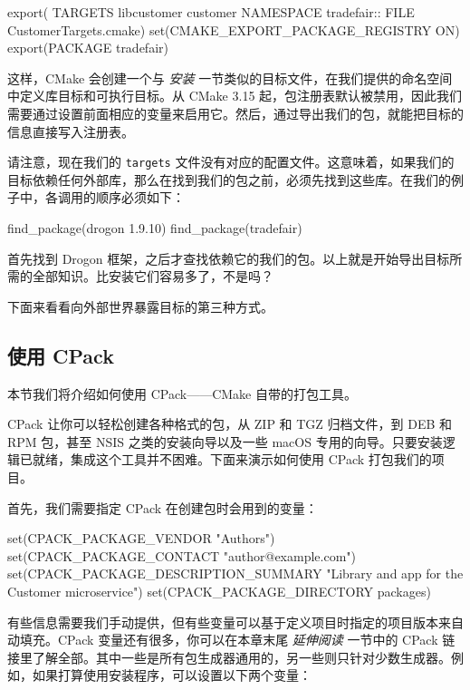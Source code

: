 \begin{codebox}[cmake]
export(
  TARGETS libcustomer customer
  NAMESPACE tradefair::
  FILE CustomerTargets.cmake)
set(CMAKE_EXPORT_PACKAGE_REGISTRY ON)
export(PACKAGE tradefair)
\end{codebox}

这样，CMake 会创建一个与 \emph{安装} 一节类似的目标文件，在我们提供的命名空间中定义库目标和可执行目标。从 CMake 3.15 起，包注册表默认被禁用，因此我们需要通过设置前面相应的变量来启用它。然后，通过导出我们的包，就能把目标的信息直接写入注册表。

请注意，现在我们的 \texttt{targets} 文件没有对应的配置文件。这意味着，如果我们的目标依赖任何外部库，那么在找到我们的包之前，必须先找到这些库。在我们的例子中，各调用的顺序必须如下：

\begin{codebox}[cmake]
find_package(drogon 1.9.10)
find_package(tradefair)
\end{codebox}

\label{idx:706}
首先找到 Drogon 框架，之后才查找依赖它的我们的包。以上就是开始导出目标所需的全部知识。比安装它们容易多了，不是吗？

下面来看看向外部世界暴露目标的第三种方式。

\subsection{使用 CPack}

\label{idx:707}
\label{idx:708}
本节我们将介绍如何使用 CPack——CMake 自带的打包工具。

CPack 让你可以轻松创建各种格式的包，从 ZIP 和 TGZ 归档文件，到 DEB 和 RPM 包，甚至 NSIS 之类的安装向导以及一些 macOS 专用的向导。只要安装逻辑已就绪，集成这个工具并不困难。下面来演示如何使用 CPack 打包我们的项目。

首先，我们需要指定 CPack 在创建包时会用到的变量：

\begin{codebox}[cmake]
set(CPACK_PACKAGE_VENDOR "Authors")
set(CPACK_PACKAGE_CONTACT "author@example.com")
set(CPACK_PACKAGE_DESCRIPTION_SUMMARY
    "Library and app for the Customer microservice")
set(CPACK_PACKAGE_DIRECTORY packages)
\end{codebox}

有些信息需要我们手动提供，但有些变量可以基于定义项目时指定的项目版本来自动填充。CPack 变量还有很多，你可以在本章末尾 \emph{延伸阅读} 一节中的 CPack 链接里了解全部。其中一些是所有包生成器通用的，另一些则只针对少数生成器。例如，如果打算使用安装程序，可以设置以下两个变量：

